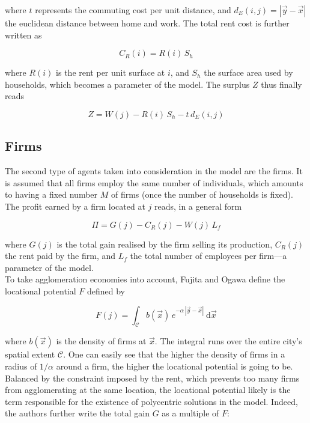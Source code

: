 where $t$ represents the commuting cost per unit distance, and $d_E(i,j) = \left| \vec{y} -
\vec{x} \right|$ the euclidean distance between home and work. The total rent
cost is further written as

\begin{equation}
    C_R\left(i\right) = R(i)\,S_h
\end{equation}

where $R(i)$ is the rent per unit surface at $i$, and $S_h$ the surface area
used by households, which becomes a parameter of the model.  The surplus $Z$
thus finally reads

\begin{equation}
    Z = W\left(j\right)
      - R\left(i\right)\,S_h
      - t\,d_E\left(i,j\right)
\end{equation} 


\subsection{Firms}
\label{sub:firms}

The second type of agents taken into consideration in the model are the firms.
It is assumed that all firms employ the same number of individuals, which
amounts to having a fixed number $M$ of firms (once the number of households is
fixed). The profit earned by a firm  located at $j$ reads, in a general
form

\begin{equation}
    \Pi = G\left(j\right) 
        - C_R\left(j\right) 
        -  W\left(j\right)\,L_f
\end{equation}

where $G(j)$ is the total gain realised by the firm selling its production,
$C_R(j)$ the rent paid by the firm, and $L_f$ the total number of employees per
firm---a parameter of the model.\\

To take agglomeration economies into account, Fujita and Ogawa define the
locational potential $F$ defined by

\begin{equation}
    F\left(j\right) = \int_{\mathcal{C}} b(\vec{x})\,e^{-\alpha\,\left|\vec{y}-\vec{x}\right|}\:\mathrm{d}\vec{x}
\end{equation}

where $b(\vec{x})$ is the density of firms at $\vec{x}$. The integral runs over
the entire city's spatial extent $\mathcal{C}$. One can easily see that the
higher the density of firms in a radius of $1/\alpha$ around a firm, the higher
the locational potential is going to be. Balanced by the constraint imposed by
the rent, which prevents too many firms from agglomerating at the same location,
the locational potential likely is the term responsible for the existence of
polycentric solutions in the model. Indeed, the authors further write the total
gain $G$ as a multiple of $F$:

